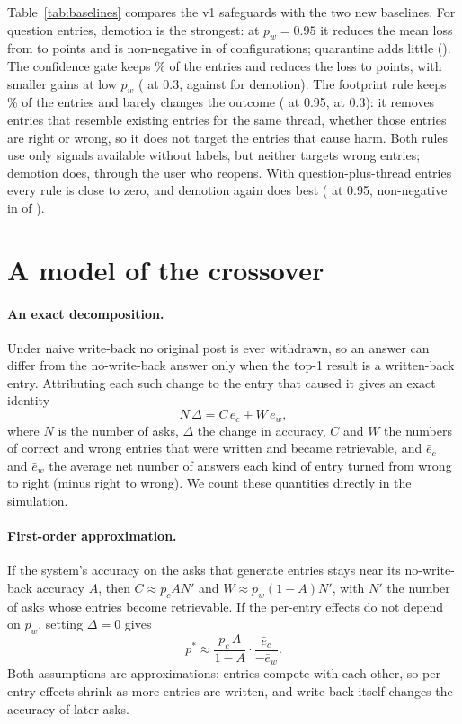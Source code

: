 \documentclass[11pt]{article}
\begin{document}
Table~\ref{tab:baselines} compares the v1 safeguards with the two new baselines. For question entries, demotion is the strongest: at $p_w=0.95$ it reduces the mean loss from \blAskNaive{} to \blAskDem{} points and is non-negative in \blNNAskDem{} of \nDenseV{} configurations; quarantine adds little (\blAskQuar). The confidence gate keeps \blKeptAskGate\% of the entries and reduces the loss to \blAskGate{} points, with smaller gains at low $p_w$ (\blThAskGate{} at 0.3, against \blThAskDem{} for demotion). The footprint rule keeps \blKeptAskFoot\% of the entries and barely changes the outcome (\blAskFoot{} at 0.95, \blThAskFoot{} at 0.3): it removes entries that resemble existing entries for the same thread, whether those entries are right or wrong, so it does not target the entries that cause harm. Both rules use only signals available without labels, but neither targets wrong entries; demotion does, through the user who reopens. With question-plus-thread entries every rule is close to zero, and demotion again does best (\blAskdocDem{} at 0.95, non-negative in \blNNAskdocDem{} of \nDenseV).

\section{A model of the crossover}
\label{sec:model}
\paragraph{An exact decomposition.} Under naive write-back no original post is ever withdrawn, so an answer can differ from the no-write-back answer only when the top-1 result is a written-back entry. Attributing each such change to the entry that caused it gives an exact identity
\begin{equation}
N\,\Delta = C\,\bar e_c + W\,\bar e_w,
\label{eq:decomp}
\end{equation}
where $N$ is the number of asks, $\Delta$ the change in accuracy, $C$ and $W$ the numbers of correct and wrong entries that were written and became retrievable, and $\bar e_c$ and $\bar e_w$ the average net number of answers each kind of entry turned from wrong to right (minus right to wrong). We count these quantities directly in the simulation.

\paragraph{First-order approximation.} If the system's accuracy on the asks that generate entries stays near its no-write-back accuracy $A$, then $C\approx p_c A N'$ and $W\approx p_w(1-A)N'$, with $N'$ the number of asks whose entries become retrievable. If the per-entry effects do not depend on $p_w$, setting $\Delta=0$ gives
\begin{equation}
p^* \approx \frac{p_c\,A}{1-A}\cdot\frac{\bar e_c}{-\bar e_w}.
\label{eq:pstar}
\end{equation}
Both assumptions are approximations: entries compete with each other, so per-entry effects shrink as more entries are written, and write-back itself changes the accuracy of later asks.
\end{document}
